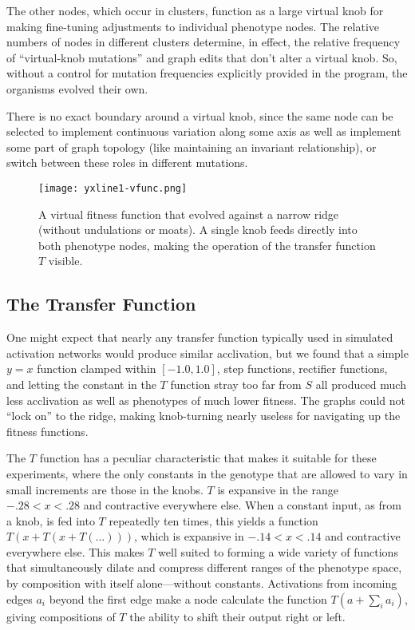\documentclass[letterpaper]{article}
\begin{document}
The other nodes, which occur in clusters, function as a large virtual knob for
making fine-tuning adjustments to individual phenotype nodes.  The relative
numbers of nodes in different clusters determine, in effect, the relative
frequency of ``virtual-knob mutations'' and graph edits that don't alter a
virtual knob. So, without a control for mutation frequencies explicitly provided
in the program, the organisms evolved their own.

There is no exact boundary around a virtual knob, since the same node can be
selected to implement continuous variation along some axis as well as implement
some part of graph topology (like maintaining an invariant relationship), or
switch between these roles in different mutations.

\begin{figure}[t]
\centering
\texttt{[image: yxline1-vfunc.png]}
\caption{A virtual fitness function that evolved against a narrow ridge
(without undulations or moats). A single knob feeds directly into both
phenotype nodes, making the operation of the transfer function $T$ visible.}
\label{fig:yxline1}
\end{figure}

\subsection{The Transfer Function}

One might expect that nearly any transfer function typically used in simulated
activation networks would produce similar acclivation, but we found that a
simple $y=x$ function clamped within $[-1.0, 1.0]$, step functions, rectifier
functions, and letting the constant in the $T$ function stray too far from $S$
all produced much less acclivation as well as phenotypes of much lower fitness.
The graphs could not ``lock on'' to the ridge, making knob-turning nearly
useless for navigating up the fitness functions.

The $T$ function has a peculiar characteristic that makes it suitable for
these experiments, where the only constants in the genotype that are allowed to
vary in small increments are those in the knobs. $T$ is expansive in the range
$-.28 < x < .28$ and contractive everywhere else. When a constant input, as
from a knob, is fed into $T$ repeatedly ten times, this yields a function
$T(x+T(x+T(\ldots)))$, which is expansive in $-.14 < x < .14$ and contractive
everywhere else. This makes $T$ well suited to forming a wide variety of
functions that simultaneously dilate and compress different ranges of the
phenotype space, by composition with itself alone---without constants.
Activations from incoming edges $a_{i}$ beyond the first edge make a node
calculate the function $T(a + \sum_i a_i)$, giving compositions of $T$ the
ability to shift their output right or left.
\end{document}
